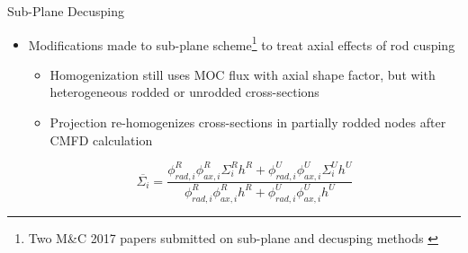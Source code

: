 \begin{frame}[t]{Sub-Plane Decusping}
    
\begin{itemize}
    \item Modifications made to sub-plane scheme\footnote{Two M{\&}C 2017 papers submitted on sub-plane and decusping methods \cite{Graham2017Improvementofthe2D/1DMethodUsingtheSub-PlaneScheme,Graham2017RodDecuspingTechniquesforthe2D/1DMethod}} to treat axial effects of rod 
    cusping
    \begin{itemize}
      \item Homogenization still uses MOC flux with axial shape factor, but 
      with heterogeneous rodded or unrodded cross-sections
      \item Projection re-homogenizes cross-sections in partially rodded nodes 
      after CMFD calculation
    \end{itemize}
    \begin{equation}\label{e:nTRACERdecusping}
    \overline{\Sigma_i} = \frac{\phi_{rad,i}^R \phi_{ax,i}^R \Sigma_i^R h^R + \phi_{rad,i}^U \phi_{ax,i}^U \Sigma_i^U h^U}{\phi_{rad,i}^R \phi_{ax,i}^R h^R + \phi_{rad,i}^U \phi_{ax,i}^U h^U} \nonumber
    \end{equation}
\end{itemize}
    
\end{frame}


